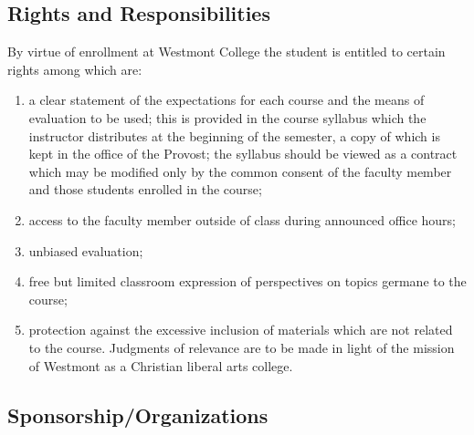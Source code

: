 	\subsection{Rights and Responsibilities}
		By virtue of enrollment at Westmont College the student is entitled to certain rights among which are:
		\begin{enumerate}[label=\alph*)]
			\item{a clear statement of the expectations for each course and the means of evaluation to be used; this is provided in the course syllabus which the instructor distributes at the beginning of the semester, a copy of which is kept in the office of the Provost; the syllabus should be viewed as a contract which may be modified only by the common consent of the faculty member and those students enrolled in the course;
			}
			\item{access to the faculty member outside of class during announced office hours;
			}
			\item{unbiased evaluation;
			}
			\item{free but limited classroom expression of perspectives on topics germane to the course;
			}
			\item{protection against the excessive inclusion of materials which are not related to the course. Judgments of relevance are to be made in light of the mission of Westmont as a Christian liberal arts college.
			}
		\end{enumerate}
	\subsection{Sponsorship/Organizations}

